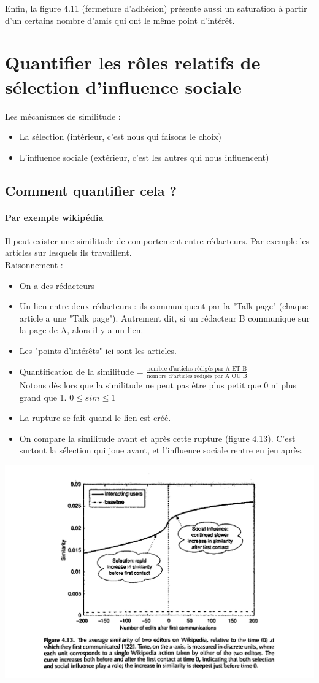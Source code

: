 Enfin, la figure 4.11 (fermeture d'adhésion) présente aussi un saturation à partir d'un certains nombre d'amis qui ont le même point d'intérêt.

\section{Quantifier les rôles relatifs de sélection d'influence sociale}
Les mécanismes de similitude :
\begin{itemize}
\item La sélection (intérieur, c'est nous qui faisons le choix)
\item L'influence sociale (extérieur, c'est les autres qui nous influencent) 
\end{itemize}
\subsection{Comment quantifier cela ?}
\paragraph*{Par exemple wikipédia}
Il peut exister une similitude de comportement entre rédacteurs. Par exemple les articles sur lesquels ils travaillent.\\
Raisonnement :
\begin{itemize}
\item On a des rédacteurs
\item Un lien entre deux rédacteurs : ils communiquent par la "Talk page" (chaque article a une "Talk page"). Autrement dit, si un rédacteur B communique sur la page de A, alors il y a un lien.
\item Les "points d'intérêts" ici sont les articles.
\item Quantification de la similitude = $\displaystyle\frac{\mbox{nombre d'articles rédigés par A ET B}}{\mbox{nombre d'articles rédigés par A OU B}}$\\
Notons dès lors que la similitude ne peut pas être plus petit que 0 ni plus grand que 1. $0 \leq sim \leq 1$
\item La rupture se fait quand le lien est créé. %
\item On compare la similitude avant et après cette rupture (figure 4.13). C'est surtout la sélection qui joue avant, et l'influence sociale rentre en jeu après.
\end{itemize}

\includegraphics[width=\textwidth]{images/21_wikipedia.jpg}
